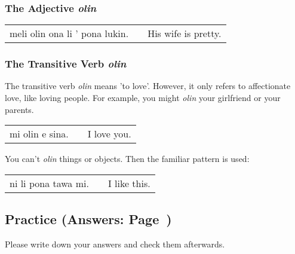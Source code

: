 %
\subsubsection*{The Adjective \textit{olin}}
%
%

\begin{supertabular}{p{5,5cm}|ll}
    meli olin ona li ' pona lukin. &  & His wife is pretty. \\
\end{supertabular}

%
\subsubsection*{The Transitive Verb \textit{olin}}
%
%

The transitive verb \textit{olin} means 'to love'.
However, it only refers to affectionate love, like loving people.
For example, you might \textit{olin} your girlfriend or your parents.

\begin{supertabular}{p{5,5cm}|ll}
    mi olin e sina. &  & I love you. \\
\end{supertabular}

You can't \textit{olin} things or objects.
Then the familiar pattern is used:

\begin{supertabular}{p{5,5cm}|ll}
    ni li pona tawa mi. &  & I like this. \\
\end{supertabular}

%
%
%
\newpage
%
\subsection*{Practice (Answers: Page~\pageref{'questions_using_seme'})}
%
Please write down your answers and check them afterwards.

